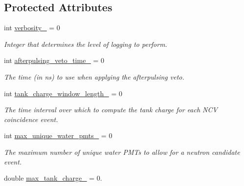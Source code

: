 \subsection*{Protected Attributes}
\begin{DoxyCompactItemize}
\item 
\hypertarget{classPhaseITreeMaker_a75f89b2e33d97896b1d9364a20e542dd}{int \hyperlink{classPhaseITreeMaker_a75f89b2e33d97896b1d9364a20e542dd}{verbosity\-\_\-} = 0}\label{classPhaseITreeMaker_a75f89b2e33d97896b1d9364a20e542dd}

\begin{DoxyCompactList}\small\item\em Integer that determines the level of logging to perform. \end{DoxyCompactList}\item 
\hypertarget{classPhaseITreeMaker_ab43b43c6e78f17bc649edc8b86b0d245}{int \hyperlink{classPhaseITreeMaker_ab43b43c6e78f17bc649edc8b86b0d245}{afterpulsing\-\_\-veto\-\_\-time\-\_\-} = 0}\label{classPhaseITreeMaker_ab43b43c6e78f17bc649edc8b86b0d245}

\begin{DoxyCompactList}\small\item\em The time (in ns) to use when applying the afterpulsing veto. \end{DoxyCompactList}\item 
\hypertarget{classPhaseITreeMaker_a7cfb0cb750c6c6bb5c7d0ece1b837dbb}{int \hyperlink{classPhaseITreeMaker_a7cfb0cb750c6c6bb5c7d0ece1b837dbb}{tank\-\_\-charge\-\_\-window\-\_\-length\-\_\-} = 0}\label{classPhaseITreeMaker_a7cfb0cb750c6c6bb5c7d0ece1b837dbb}

\begin{DoxyCompactList}\small\item\em The time interval over which to compute the tank charge for each N\-C\-V coincidence event. \end{DoxyCompactList}\item 
\hypertarget{classPhaseITreeMaker_a4cf3023fb082c58b2ce75ee63cb60372}{int \hyperlink{classPhaseITreeMaker_a4cf3023fb082c58b2ce75ee63cb60372}{max\-\_\-unique\-\_\-water\-\_\-pmts\-\_\-} = 0}\label{classPhaseITreeMaker_a4cf3023fb082c58b2ce75ee63cb60372}

\begin{DoxyCompactList}\small\item\em The maximum number of unique water P\-M\-Ts to allow for a neutron candidate event. \end{DoxyCompactList}\item 
\hypertarget{classPhaseITreeMaker_a987ef63235bef3d80f1b212ecd6bc5f5}{double \hyperlink{classPhaseITreeMaker_a987ef63235bef3d80f1b212ecd6bc5f5}{max\-\_\-tank\-\_\-charge\-\_\-} = 0.}\label{classPhaseITreeMaker_a987ef63235bef3d80f1b212ecd6bc5f5}


\end{DoxyCompactItemize}
